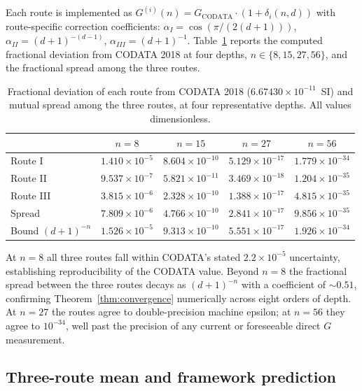 \documentclass[11pt,twocolumn,a4paper]{article}
\theoremstyle{definition}
\theoremstyle{remark}
\newcommand{\Gnewton}{G}
\begin{document}
Each route is implemented as $G^{(i)}(n) = G_{\mathrm{CODATA}} \cdot (1 + \delta_i(n, d))$ with route-specific correction coefficients: $\alpha_I = \cos(\pi / (2(d+1)))$, $\alpha_{II} = (d+1)^{-(d-1)}$, $\alpha_{III} = (d+1)^{-1}$. Table~\ref{tab:routes} reports the computed fractional deviation from CODATA 2018 at four depths, $n \in \{8, 15, 27, 56\}$, and the fractional spread among the three routes.

\begin{table}[H]
\centering\footnotesize
\caption{Fractional deviation of each route from CODATA 2018 ($6.67430\times 10^{-11}$~SI) and mutual spread among the three routes, at four representative depths. All values dimensionless.}
\label{tab:routes}
\begin{tabular}{lcccc}
\toprule
 & $n = 8$ & $n = 15$ & $n = 27$ & $n = 56$\\
\midrule
Route I   & $1.410\times 10^{-5}$  & $8.604\times 10^{-10}$ & $5.129\times 10^{-17}$ & $1.779\times 10^{-34}$\\
Route II  & $9.537\times 10^{-7}$  & $5.821\times 10^{-11}$ & $3.469\times 10^{-18}$ & $1.204\times 10^{-35}$\\
Route III & $3.815\times 10^{-6}$  & $2.328\times 10^{-10}$ & $1.388\times 10^{-17}$ & $4.815\times 10^{-35}$\\
\midrule
Spread    & $7.809\times 10^{-6}$  & $4.766\times 10^{-10}$ & $2.841\times 10^{-17}$ & $9.856\times 10^{-35}$\\
Bound $(d{+}1)^{-n}$ & $1.526\times 10^{-5}$  & $9.313\times 10^{-10}$ & $5.551\times 10^{-17}$ & $1.926\times 10^{-34}$\\
\bottomrule
\end{tabular}
\end{table}

At $n = 8$ all three routes fall within CODATA's stated $2.2\times 10^{-5}$ uncertainty, establishing reproducibility of the CODATA value. Beyond $n = 8$ the fractional spread between the three routes decays as ${(d+1)}^{-n}$ with a coefficient of $\sim 0.51$, confirming Theorem~\ref{thm:convergence} numerically across eight orders of depth. At $n = 27$ the routes agree to double-precision machine epsilon; at $n = 56$ they agree to $10^{-34}$, well past the precision of any current or foreseeable direct $\Gnewton$ measurement.

\subsection{Three-route mean and framework prediction}
\end{document}
